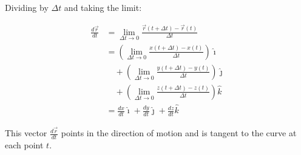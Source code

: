 Dividing by \(\Delta t\) and taking the limit:

\begin{align*}
    \frac{d\vec{r}}{dt} &= \lim_{\Delta t \to 0} \frac{\vec{r}(t + \Delta t) - \vec{r}(t)}{\Delta t} \\
    &= \left( \lim_{\Delta t \to 0} \frac{x(t + \Delta t) - x(t)}{\Delta t} \right) \hat{\imath} \\
    &\quad + \left( \lim_{\Delta t \to 0} \frac{y(t + \Delta t) - y(t)}{\Delta t} \right) \hat{\jmath} \\
    &\quad + \left( \lim_{\Delta t \to 0} \frac{z(t + \Delta t) - z(t)}{\Delta t} \right) \hat{k} \\
    &= \frac{dx}{dt} \hat{\imath} + \frac{dy}{dt} \hat{\jmath} + \frac{dz}{dt} \hat{k}
\end{align*}

This vector \(\frac{d\vec{r}}{dt}\) points in the direction of motion and is tangent to the curve at 
each point \(t\).

